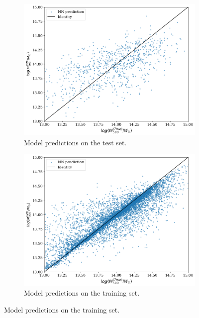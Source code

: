 \begin{figure}[H]
\centering
\begin{subfigure}{.46\textwidth}
  \centering
  \includegraphics[width=\linewidth]{images/Chapter4/Res152/res152_test.png}
  \caption{Model predictions on the test set.}
  \label{fig:best_perf_resnet152_a}
\end{subfigure}%
\hspace{.6em}
\begin{subfigure}{.46\textwidth}
  \centering
  \includegraphics[width=\linewidth]{images/Chapter4/Res152/res152_train.png}
  \caption{Model predictions on the training set.}
  \label{fig:best_perf_resnet152_b}
\end{subfigure}

\end{figure}
